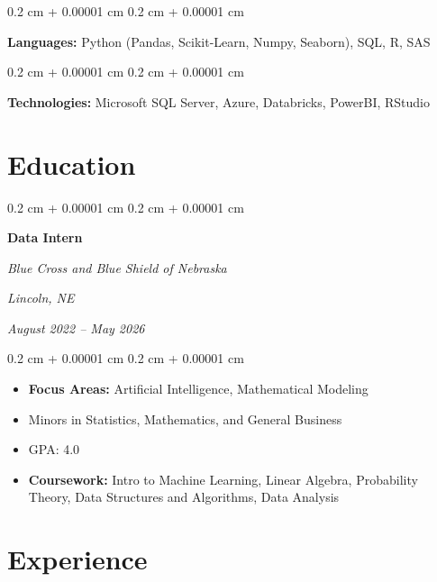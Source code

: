 \documentclass[11pt, letterpaper]{article}
\newenvironment{highlights}{
    \begin{itemize}[
        topsep=0.10 cm,
        parsep=0.10 cm,
        partopsep=0pt,
        itemsep=0pt,
        leftmargin=0.4 cm + 10pt
    ]
}{
    \end{itemize}
} %
\newenvironment{onecolentry}{
    \begin{adjustwidth}{
        0.2 cm + 0.00001 cm
    }{
        0.2 cm + 0.00001 cm
    }
}{
    \end{adjustwidth}
} %
\newenvironment{twocolentry}[2][]{
    \onecolentry
    \def\secondColumn{#2}
    \setcolumnwidth{\fill, 5.0 cm}
    \begin{paracol}{2}
}{
    \switchcolumn \raggedleft \secondColumn
    \end{paracol}
    \endonecolentry
} %
\begin{document}
        
        \begin{onecolentry}
            \textbf{Languages:} Python (Pandas, Scikit-Learn, Numpy, Seaborn), SQL, R, SAS 
        \end{onecolentry}

        \vspace{0.2 cm}

        \begin{onecolentry}
            \textbf{Technologies:} Microsoft SQL Server, Azure, Databricks, PowerBI, RStudio
        \end{onecolentry}



    \section{Education}



        
        \begin{twocolentry}{
        \textit{Lincoln, NE}    
            
        \textit{August 2022 – May 2026}}
            \textbf{Data Intern}
            
            \textit{Blue Cross and Blue Shield of Nebraska }
        \end{twocolentry}

        \vspace{0.10 cm}
        \begin{onecolentry}
            \begin{highlights}
                \item \textbf{Focus Areas:} Artificial Intelligence, Mathematical Modeling
                \item Minors in Statistics, Mathematics, and General Business
                \item GPA: 4.0
                \item \textbf{Coursework:} Intro to Machine Learning, Linear Algebra, Probability Theory, Data Structures and Algorithms, Data Analysis
            \end{highlights}
        \end{onecolentry}



    
    \section{Experience}
\end{document}
